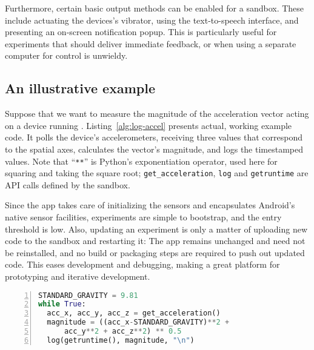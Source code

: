 Furthermore, certain basic output methods can be enabled for a sandbox. 
These include actuating the devices's vibrator, using the text-to-speech 
interface, and presenting an on-screen notification popup.
This is particularly useful for 
experiments that should deliver immediate feedback, or when using a separate 
computer for control is unwieldy.


\subsection{An illustrative example}

Suppose that we want to measure the magnitude of the acceleration 
vector acting on a device running \sys.
Listing~\ref{alg:log-accel} presents actual, working example code.
It polls the device's accelerometers, receiving three values that correspond 
to the spatial axes, calculates the vector's magnitude, and logs the 
timestamped values. Note that ``\texttt{**}'' is Python's exponentiation 
operator, used here for squaring and taking the square root; 
\texttt{get\_acceleration}, \texttt{log} and \texttt{getruntime} are 
API calls defined by the \sys sandbox.

Since the \sys app takes care of initializing the sensors and encapsulates 
Android's native sensor facilities, experiments are simple to bootstrap, 
and the entry threshold is low. Also, updating an experiment is only a 
matter of uploading new code to the sandbox and restarting it: The \sys 
app remains unchanged and need not be reinstalled, and no build or 
packaging steps are required to push out updated code. This eases 
development and debugging, making \sys a great platform for prototyping 
and iterative development.

\begin{lstlisting}[language=Python,float,numbers=left,basicstyle=\small,emph={get_acceleration},xleftmargin=2em,emphstyle=\textit,label=alg:log-accel,caption=\textsc{Code sample: Log the magnitude of acceleration}]
STANDARD_GRAVITY = 9.81
while True:
  acc_x, acc_y, acc_z = get_acceleration()
  magnitude = ((acc_x-STANDARD_GRAVITY)**2 + 
      acc_y**2 + acc_z**2) ** 0.5
  log(getruntime(), magnitude, "\n")
\end{lstlisting}
